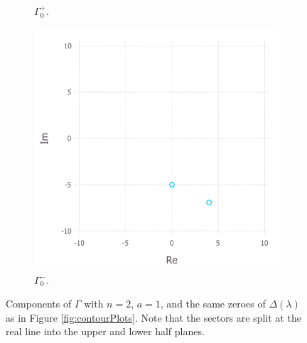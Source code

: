 \documentclass[11pt, oneside, a4paper]{article}
\begin{document}
\begin{figure}
\begin{subfigure}{.5\textwidth}
        \caption{$\Gamma_0^+$.}
    \end{subfigure}
    \begin{subfigure}{.5\textwidth}
        \centering
        \includegraphics[width=1\linewidth]{contourPlot_n=2_a=1_gamma0Minus_cropped.pdf}
        \caption{$\Gamma_0^-$.}
    \end{subfigure}
    \caption{Components of $\Gamma$ with $n=2$, $a=1$, and the same zeroes of $\Delta(\lambda)$ as in Figure \ref{fig:contourPlots}. Note that the sectors are split at the real line into the upper and lower half planes.}
    \label{fig:contourPlot_n=2}
\end{figure}

\end{document}
